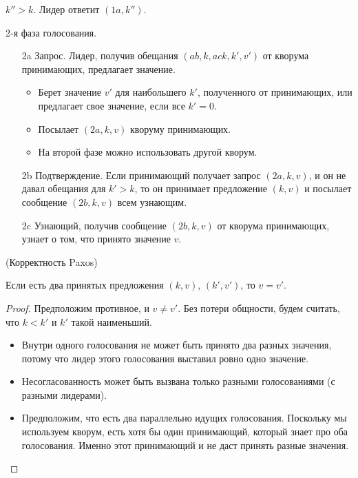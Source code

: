 \begin{algorithm}
\begin{itemize}
\begin{itemize}
                    $k'' > k$. Лидер ответит $(1a, k'')$.
            \end{itemize}
    \end{itemize}
    2-я фаза голосования.
    \begin{itemize}
        \item[2a] Запрос. Лидер, получив обещания $(ab, k, ack, k', v')$ от
            кворума принимающих, предлагает значение.
            \begin{itemize}
                \item Берет значение $v'$ для наибольшего $k'$, полученного
                    от принимающих, или предлагает свое значение, если
                    все $k' = 0$.
                \item Посылает $(2a, k, v)$ кворуму принимающих.
                \item На второй фазе можно использовать другой кворум.
            \end{itemize}
        \item[2b] Подтверждение. Если принимающий получает запрос $(2a, k, v)$,
            и он не давал обещания для $k' > k$, то он принимает предложение $(k, v)$
            и посылает сообщение $(2b, k, v)$ всем узнающим.
        \item[2c] Узнающий, получив сообщение $(2b, k, v)$ от кворума принимающих,
            узнает о том, что принято значение $v$.
    \end{itemize}
\end{algorithm}

\begin{theorem}(Корректность Paxos)

    Если есть два принятых предложения $(k, v)$, $(k', v')$, то $v = v'$.
\end{theorem}
\begin{proof}
    Предположим противное, и $v \neq v'$. Без потери общности, будем считать, что
    $k < k'$ и $k'$ такой наименьший.
    \begin{itemize}
        \item Внутри одного голосования не может быть принято два разных значения,
            потому что лидер этого голосования выставил ровно одно значение.
        \item Несогласованность может быть вызвана только разными голосованиями
            (с разными лидерами).
        \item Предположим, что есть два параллельно идущих голосования. Поскольку
            мы используем кворум, есть хотя бы один принимающий, который
            знает про оба голосования. Именно этот принимающий и не даст
            принять разные значения.
    \end{itemize}
\end{proof}
